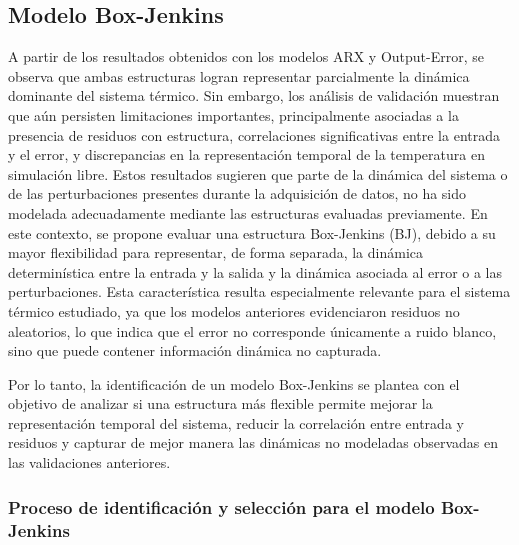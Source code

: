\documentclass[11pt]{report}
\begin{document}
\subsection{Modelo Box-Jenkins}

A partir de los resultados obtenidos con los modelos ARX y Output-Error, se observa que ambas estructuras logran representar parcialmente la dinámica dominante del sistema térmico. Sin embargo, los análisis de validación muestran que aún persisten limitaciones importantes, principalmente asociadas a la presencia de residuos con estructura, correlaciones significativas entre la entrada y el error, y discrepancias en la representación temporal de la temperatura en simulación libre. Estos resultados sugieren que parte de la dinámica del sistema o de las perturbaciones presentes durante la adquisición de datos, no ha sido modelada adecuadamente mediante las estructuras evaluadas previamente.
En este contexto, se propone evaluar una estructura Box-Jenkins (BJ), debido a su mayor flexibilidad para representar, de forma separada, la dinámica determinística entre la entrada y la salida y la dinámica asociada al error o a las perturbaciones. Esta característica resulta especialmente relevante para el sistema térmico estudiado, ya que los modelos anteriores evidenciaron residuos no aleatorios, lo que indica que el error no corresponde únicamente a ruido blanco, sino que puede contener información dinámica no capturada.

Por lo tanto, la identificación de un modelo Box-Jenkins se plantea con el objetivo de analizar si una estructura más flexible permite mejorar la representación temporal del sistema, reducir la correlación entre entrada y residuos y capturar de mejor manera las dinámicas no modeladas observadas en las validaciones anteriores. 



\subsubsection{Proceso de identificación y selección para el modelo Box-Jenkins}
\end{document}
